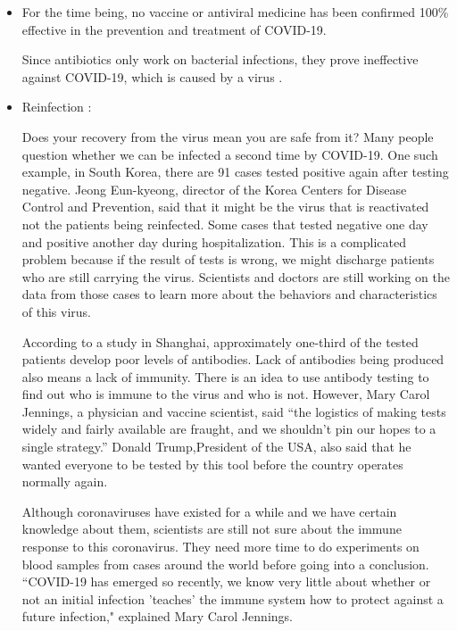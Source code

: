 \begin{itemize}
      \item For the time being, no vaccine or antiviral medicine has been confirmed 100\% effective in the prevention and treatment of COVID-19.
      \par Since antibiotics only work on bacterial infections, they prove ineffective against COVID-19, which is caused by a virus \parencite{Q&A_WHO}.
      \item Reinfection \parencite{Reinfection_abcnews} \parencite{Reinfection_independent}:
      \par Does your recovery from the virus mean you are safe from it? Many people question whether we can be infected a second time by COVID-19. One such example, in South Korea, there are 91 cases tested positive again after testing negative. Jeong Eun-kyeong, director of the Korea Centers for Disease Control and Prevention, said that it might be the virus that is reactivated not the patients being reinfected. Some cases that tested negative one day and positive another day during hospitalization. This is a complicated problem because if the result of tests is wrong, we might discharge patients who are still carrying the virus. Scientists and doctors are still working on the data from those cases to learn more about the behaviors and characteristics of this virus.
      \par According to a study in Shanghai, approximately one-third of the tested patients develop poor levels of antibodies. Lack of antibodies being produced also means a lack of immunity. There is an idea to use antibody testing to find out who is immune to the virus and who is not. However, Mary Carol Jennings, a physician and vaccine scientist, said “the logistics of making tests widely and fairly available are fraught, and we shouldn't pin our hopes to a single strategy.” Donald Trump,President of the USA, also said that he wanted everyone to be tested by this tool before the country operates normally again.
      \par Although coronaviruses have existed for a while and we have certain knowledge about them, scientists are still not sure about the immune response to this coronavirus. They need more time to do experiments on blood samples from cases around the world before going into a conclusion. ``COVID-19 has emerged so recently, we know very little about whether or not an initial infection 'teaches' the immune system how to protect against a future infection," explained Mary Carol Jennings.
    \end{itemize}
  
